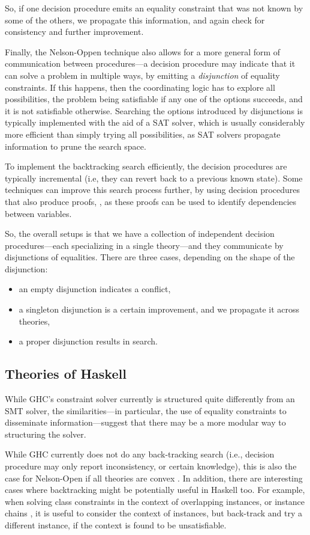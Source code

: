 \documentclass{sigplanconf}
\begin{document}
So, if one decision procedure emits an equality constraint that was not
known by some of the others, we propagate this information, and again
check for consistency and further improvement.

Finally, the Nelson-Oppen technique also allows for a more general
form of communication between procedures---a decision procedure may
indicate that it can solve a problem in multiple ways, by emitting
a {\em disjunction} of equality constraints.  If this happens,
then the coordinating logic has to explore all possibilities, the problem being
satisfiable if any one of the options succeeds, and it is not satisfiable
otherwise.  Searching the options introduced by disjunctions is typically
implemented with the aid of a SAT solver, which is usually considerably
more efficient than simply trying all possibilities, as SAT solvers
propagate information to prune the search space.

To implement the backtracking search efficiently, the decision procedures
are typically incremental (i.e, they can revert back to a previous
known state).  Some techniques can improve this search process further,
by using decision procedures that also produce proofs, \cite{cvc4-lin-arith},
as these proofs can be used to identify dependencies between variables.

So, the overall setups is that we have a collection of independent
decision procedures---each specializing in a single theory---and
they communicate by disjunctions of equalities.  There are three cases,
depending on the shape of the disjunction:
\begin{itemize}
\item an empty disjunction indicates a conflict,
\item a singleton disjunction is a certain improvement, and we propagate
it across theories,
\item a proper disjunction results in search.
\end{itemize}

\subsection{Theories of Haskell}

While GHC's constraint solver currently is structured quite differently
from an SMT solver, the similarities---in particular, the use of equality
constraints to disseminate information---suggest that there may be
a more modular way to structuring the solver.

While GHC currently does not do any back-tracking search (i.e., decision
procedure may only report inconsistency, or certain knowledge), this
is also the case for Nelson-Open if all theories are convex \cite{NelsonOppen}.
In addition,
there are interesting cases where backtracking might be potentially useful
in Haskell too.  For example, when solving class constraints in the
context of overlapping instances, or instance chains \cite{instance-chains},
it is useful to consider the context of instances,
but back-track and try a different instance, if the context is found
to be unsatisfiable.
\end{document}
